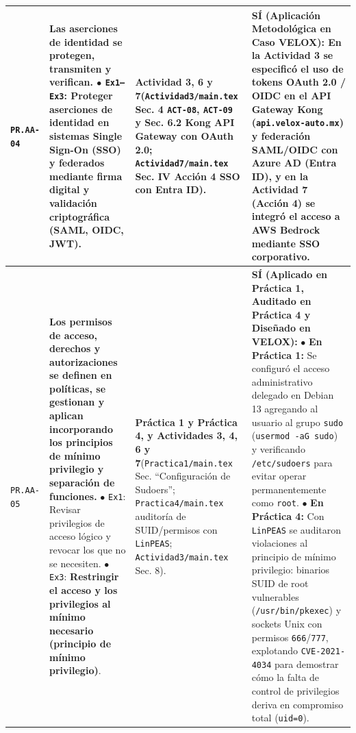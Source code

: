 \documentclass[letterpaper,11pt]{article}
\begin{document}
\begin{longtable}{|C{1.5cm}|L{5.3cm}|L{4.3cm}|L{5.8cm}|}
\texttt{PR.AA-04} &
\textbf{Las aserciones de identidad se protegen, transmiten y verifican.}\newline
$\bullet$ \texttt{Ex1--Ex3}: Proteger aserciones de identidad en sistemas Single Sign-On (SSO) y federados mediante firma digital y validación criptográfica (SAML, OIDC, JWT). &
\textbf{Actividad 3, 6 y 7}\newline (\texttt{Actividad3/main.tex} Sec. 4 \texttt{ACT-08}, \texttt{ACT-09} y Sec. 6.2 Kong API Gateway con OAuth 2.0; \texttt{Actividad7/main.tex} Sec. IV Acción 4 SSO con Entra ID). &
\textbf{SÍ (Aplicación Metodológica en Caso VELOX):}\newline
En la Actividad 3 se especificó el uso de tokens \textbf{OAuth 2.0 / OIDC} en el API Gateway Kong (\texttt{api.velox-auto.mx}) y federación SAML/OIDC con Azure AD (Entra ID), y en la Actividad 7 (Acción 4) se integró el acceso a AWS Bedrock mediante SSO corporativo. \\
\hline

\texttt{PR.AA-05} &
\textbf{Los permisos de acceso, derechos y autorizaciones se definen en políticas, se gestionan y aplican incorporando los principios de mínimo privilegio y separación de funciones.}\newline
$\bullet$ \texttt{Ex1}: Revisar privilegios de acceso lógico y revocar los que no se necesiten.\newline
$\bullet$ \texttt{Ex3}: \textbf{Restringir el acceso y los privilegios al mínimo necesario (principio de mínimo privilegio)}. &
\textbf{Práctica 1 y Práctica 4, y Actividades 3, 4, 6 y 7}\newline (\texttt{Practica1/main.tex} Sec. ``Configuración de Sudoers''; \texttt{Practica4/main.tex} auditoría de SUID/permisos con \texttt{LinPEAS}; \texttt{Actividad3/main.tex} Sec. 8). &
\textbf{SÍ (Aplicado en Práctica 1, Auditado en Práctica 4 y Diseñado en VELOX):}\newline
$\bullet$ \textbf{En Práctica 1:} Se configuró el acceso administrativo delegado en Debian 13 agregando al usuario al grupo \texttt{sudo} (\texttt{usermod -aG sudo}) y verificando \texttt{/etc/sudoers} para evitar operar permanentemente como \texttt{root}.\newline
$\bullet$ \textbf{En Práctica 4:} Con \texttt{LinPEAS} se auditaron violaciones al principio de mínimo privilegio: binarios SUID de root vulnerables (\texttt{/usr/bin/pkexec}) y sockets Unix con permisos \texttt{666}/\texttt{777}, explotando \texttt{CVE-2021-4034} para demostrar cómo la falta de control de privilegios deriva en compromiso total (\texttt{uid=0}). \\
\hline


\end{longtable}
\end{document}
